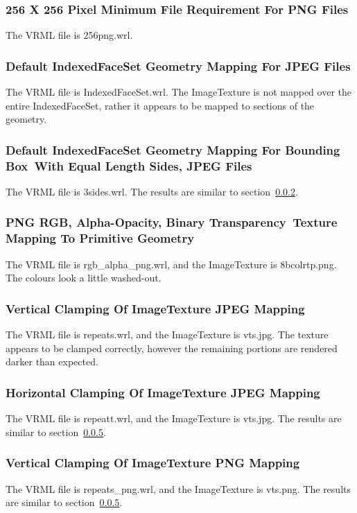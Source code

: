 \documentclass[12pt,letterpaper]{article}
\newcommand{\ITF}{256 X 256 Pixel Minimum File Requirement For PNG Files}
\newcommand{\ITG}{Default IndexedFaceSet Geometry Mapping For JPEG Files}
\newcommand{\ITHa}{Default IndexedFaceSet Geometry Mapping For Bounding Box~}
\newcommand{\ITHb}{With Equal Length Sides, JPEG Files}
\newcommand{\ITWa}{PNG RGB, Alpha-Opacity, Binary Transparency~}
\newcommand{\ITWb}{Texture Mapping To Primitive Geometry}
\newcommand{\ITAD}{Vertical Clamping Of ImageTexture JPEG Mapping}
\newcommand{\ITAE}{Horizontal Clamping Of ImageTexture JPEG Mapping}
\newcommand{\ITAG}{Vertical Clamping Of ImageTexture PNG Mapping}
\begin{document}
\subsubsection{\ITF}
The VRML file is 256png.wrl.

\subsubsection{\ITG}
\label{sec:jpeg-ifs}
The VRML file is IndexedFaceSet.wrl.\newline
The ImageTexture is not mapped over the entire IndexedFaceSet, rather
it appears to be mapped to sections of the geometry.

\subsubsection{\ITHa\ITHb}
The VRML file is 3sides.wrl.\newline
The results are similar to section~\ref{sec:jpeg-ifs}.

\setcounter{subsubsection}{22}
\subsubsection{\ITWa\ITWb}
The VRML file is rgb\_alpha\_png.wrl, and the ImageTexture is 8bcolrtp.png.\newline
The colours look a little washed-out.

\setcounter{subsubsection}{29}
\subsubsection{\ITAD}
\label{sec:vert-clamp}
The VRML file is repeats.wrl, and the ImageTexture is vts.jpg.\newline
The texture appears to be clamped correctly, however the remaining portions are rendered
darker than expected.

\subsubsection{\ITAE}
The VRML file is repeatt.wrl, and the ImageTexture is vts.jpg.\newline
The results are similar to section~\ref{sec:vert-clamp}.

\setcounter{subsubsection}{32}
\subsubsection{\ITAG}
The VRML file is repeats\_png.wrl, and the ImageTexture is vts.png.\newline
The results are similar to section~\ref{sec:vert-clamp}.
\end{document}

